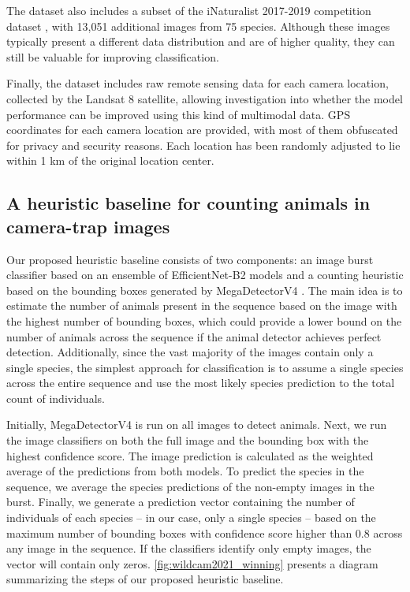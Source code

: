 The dataset also includes a subset of the iNaturalist 2017-2019 competition
dataset \citep{horn2018inat}, with 13,051 additional images from 75 species.
Although these images typically present a different data distribution and are of
higher quality, they can still be valuable for improving classification.

Finally, the dataset includes raw remote sensing data for each camera location,
collected by the Landsat 8 satellite, allowing investigation into whether the
model performance can be improved using this kind of multimodal data. GPS
coordinates for each camera location are provided, with most of them obfuscated
for privacy and security reasons. Each location has been randomly adjusted to
lie within 1 km of the original location center.

\subsection{A heuristic baseline for counting animals in camera-trap
images}

Our proposed heuristic baseline consists of two components: an image burst
classifier based on an ensemble of EfficientNet-B2 \citep{tan2019efficientnet}
models and a counting heuristic based on the bounding boxes generated by
MegaDetectorV4 \citep{beery2019efficient}. The main idea is to estimate the
number of animals present in the sequence based on the image with the highest
number of bounding boxes, which could provide a lower bound on the number of
animals across the sequence if the animal detector achieves perfect detection.
Additionally, since the vast majority of the images contain only a single
species, the simplest approach for classification is to assume a single species
across the entire sequence and use the most likely species prediction to the
total count of individuals.

Initially, MegaDetectorV4 is run on all images to detect animals. Next, we run
the image classifiers on both the full image and the bounding box with the
highest confidence score. The image prediction is calculated as the weighted
average of the predictions from both models. To predict the species in the
sequence, we average the species predictions of the non-empty images in the
burst. Finally, we generate a prediction vector containing the number of
individuals of each species -- in our case, only a single species -- based on
the maximum number of bounding boxes with confidence score higher than $0.8$
across any image in the sequence. If the classifiers identify only empty images,
the vector will contain only zeros. \autoref{fig:wildcam2021_winning}
presents a diagram summarizing the steps of our proposed heuristic baseline.

